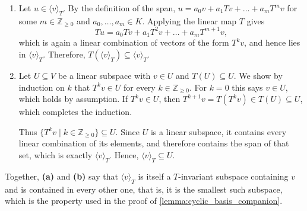 \begin{exercisesolution}
\label{sol:cyclic_minimal}
  \begin{enumerate}[label=\textbf{(\alph*)}]
    \item Let $u \in \langle v \rangle_T$. By the definition of the span, $u = a_0 v + a_1 Tv + \dots + a_m T^m v$ for some $m \in \mathbb{Z}_{\ge 0}$ and $a_0, \dots, a_m \in K$. Applying the linear map $T$ gives
      \[ Tu = a_0 Tv + a_1 T^2 v + \dots + a_m T^{m+1} v, \]
      which is again a linear combination of vectors of the form $T^k v$, and hence lies in $\langle v \rangle_T$. Therefore, $T(\langle v \rangle_T) \subseteq \langle v \rangle_T$.
    \item Let $U \subseteq V$ be a linear subspace with $v \in U$ and $T(U) \subseteq U$. We show by induction on $k$ that $T^k v \in U$ for every $k \in \mathbb{Z}_{\ge 0}$. For $k = 0$ this says $v \in U$, which holds by assumption. If $T^k v \in U$, then $T^{k+1} v = T(T^k v) \in T(U) \subseteq U$, which completes the induction.

      Thus $\{T^k v \mid k \in \mathbb{Z}_{\ge 0}\} \subseteq U$. Since $U$ is a linear subspace, it contains every linear combination of its elements, and therefore contains the span of that set, which is exactly $\langle v \rangle_T$. Hence, $\langle v \rangle_T \subseteq U$.
  \end{enumerate}
  Together, \textbf{(a)} and \textbf{(b)} say that $\langle v \rangle_T$ is itself a $T$-invariant subspace containing $v$ and is contained in every other one, that is, it is the smallest such subspace, which is the property used in the proof of \cref{lemma:cyclic_basis_companion}.
\end{exercisesolution}



